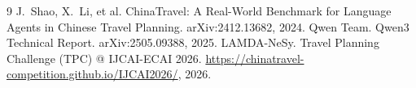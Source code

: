 \documentclass{article}
\begin{document}
\begin{thebibliography}{9}\small
{}
J.~Shao, X.~Li, et al.
\newblock ChinaTravel: A Real-World Benchmark for Language Agents in
Chinese Travel Planning.
\newblock arXiv:2412.13682, 2024.
Qwen Team.
\newblock Qwen3 Technical Report.
\newblock arXiv:2505.09388, 2025.
LAMDA-NeSy.
\newblock Travel Planning Challenge (TPC) @ IJCAI-ECAI 2026.
\newblock \url{https://chinatravel-competition.github.io/IJCAI2026/}, 2026.
\end{thebibliography}
\end{document}
